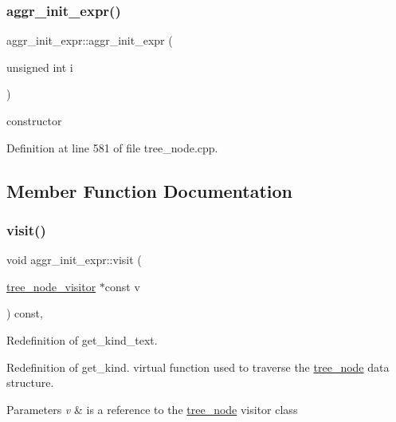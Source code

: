 \subsubsection{\texorpdfstring{aggr\+\_\+init\+\_\+expr()}{aggr\_init\_expr()}}
{\footnotesize\ttfamily aggr\+\_\+init\+\_\+expr\+::aggr\+\_\+init\+\_\+expr (\begin{DoxyParamCaption}\item[{unsigned int}]{i }\end{DoxyParamCaption})\hspace{0.3cm}{\ttfamily [explicit]}}



constructor 



Definition at line 581 of file tree\+\_\+node.\+cpp.



\subsection{Member Function Documentation}
\mbox{\label{structaggr__init__expr_af28d5b47d09253a4ab8b59fbf776369d}} 
\subsubsection{\texorpdfstring{visit()}{visit()}}
{\footnotesize\ttfamily void aggr\+\_\+init\+\_\+expr\+::visit (\begin{DoxyParamCaption}\item[{\hyperlink{classtree__node__visitor}{tree\+\_\+node\+\_\+visitor} $\ast$const}]{v }\end{DoxyParamCaption}) const\hspace{0.3cm}{\ttfamily [override]}, {\ttfamily [virtual]}}



Redefinition of get\+\_\+kind\+\_\+text. 

Redefinition of get\+\_\+kind. virtual function used to traverse the \hyperlink{classtree__node}{tree\+\_\+node} data structure. 
\begin{DoxyParams}{Parameters}
{\em v} & is a reference to the \hyperlink{classtree__node}{tree\+\_\+node} visitor class \\
\hline
\end{DoxyParams}


